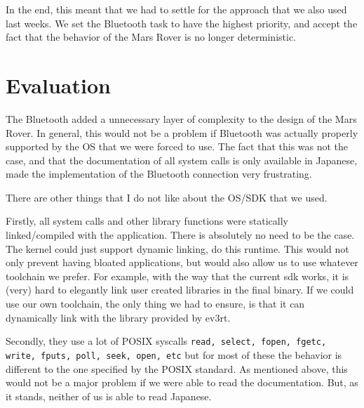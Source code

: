 \documentclass{scrartcl}
\begin{document}
In the end, this meant that we had to settle for the approach that we also used last weeks.
We set the Bluetooth task to have the highest priority, and accept the fact that the behavior of the Mars Rover is no longer deterministic.

\section{Evaluation}
The Bluetooth added a unnecessary layer of complexity to the design of the Mars Rover.
In general, this would not be a problem if Bluetooth was actually properly supported by the OS that we were forced to use.
The fact that this was not the case, and that the documentation of all system calls is only available in Japanese, made the implementation of the Bluetooth connection very frustrating.

There are other things that I do not like about the OS/SDK that we used.

Firstly, all system calls and other library functions were statically linked/compiled with the application.
There is absolutely no need to be the case.
The kernel could just support dynamic linking, do this runtime.
This would not only prevent having bloated applications, but would also allow us to use whatever toolchain we prefer.
For example, with the way that the current sdk works, it is (very) hard to elegantly link user created libraries in the final binary.
If we could use our own toolchain, the only thing we had to ensure, is that it can dynamically link with the library provided by ev3rt.

Secondly, they use a lot of POSIX syscalls \texttt{read, select, fopen, fgetc, write,
fputs, poll, seek, open, etc} but for most of these the behavior is different to the one specified by the POSIX standard.
As mentioned above, this would not be a major problem if we were able to read the documentation.
But, as it stands, neither of us is able to read Japanese.
\end{document}
